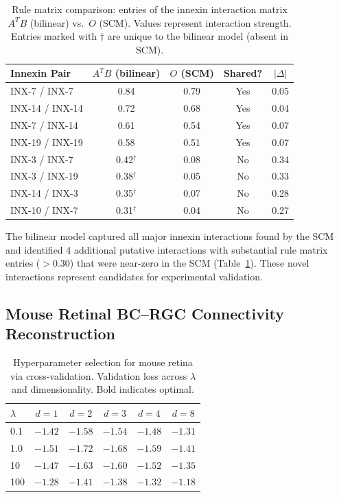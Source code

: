 \documentclass[11pt]{article}
\begin{document}
\begin{table}[H]
\centering
\caption{Rule matrix comparison: entries of the innexin interaction matrix $A^TB$ (bilinear) vs.\ $O$ (SCM). Values represent interaction strength. Entries marked with $\dagger$ are unique to the bilinear model (absent in SCM).}
\label{tab:rule_matrix}
\begin{tabular}{lcccc}
\toprule
Innexin Pair & $A^TB$ (bilinear) & $O$ (SCM) & Shared? & $|\Delta|$ \\
\midrule
INX-7 / INX-7 & 0.84 & 0.79 & Yes & 0.05 \\
INX-14 / INX-14 & 0.72 & 0.68 & Yes & 0.04 \\
INX-7 / INX-14 & 0.61 & 0.54 & Yes & 0.07 \\
INX-19 / INX-19 & 0.58 & 0.51 & Yes & 0.07 \\
INX-3 / INX-7 & 0.42$^\dagger$ & 0.08 & No & 0.34 \\
INX-3 / INX-19 & 0.38$^\dagger$ & 0.05 & No & 0.33 \\
INX-14 / INX-3 & 0.35$^\dagger$ & 0.07 & No & 0.28 \\
INX-10 / INX-7 & 0.31$^\dagger$ & 0.04 & No & 0.27 \\
\bottomrule
\end{tabular}
\end{table}

The bilinear model captured all major innexin interactions found by the SCM and identified 4 additional putative interactions with substantial rule matrix entries ($> 0.30$) that were near-zero in the SCM (Table~\ref{tab:rule_matrix}). These novel interactions represent candidates for experimental validation.

\subsection{Mouse Retinal BC--RGC Connectivity Reconstruction}

\begin{table}[H]
\centering
\caption{Hyperparameter selection for mouse retina via cross-validation. Validation loss across $\lambda$ and dimensionality. Bold indicates optimal.}
\label{tab:hyper_retina}
\begin{tabular}{lccccc}
\toprule
$\lambda$ & $d = 1$ & $d = 2$ & $d = 3$ & $d = 4$ & $d = 8$ \\
\midrule
0.1 & $-1.42$ & $-1.58$ & $-1.54$ & $-1.48$ & $-1.31$ \\
1.0 & $-1.51$ & $\mathbf{-1.72}$ & $-1.68$ & $-1.59$ & $-1.41$ \\
10 & $-1.47$ & $-1.63$ & $-1.60$ & $-1.52$ & $-1.35$ \\
100 & $-1.28$ & $-1.41$ & $-1.38$ & $-1.32$ & $-1.18$ \\
\bottomrule
\end{tabular}
\end{table}
\end{document}
